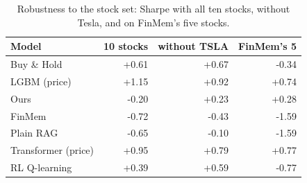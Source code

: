\begin{table}[H]
\centering
\small
\caption{Robustness to the stock set: Sharpe with all ten stocks, without Tesla, and on FinMem's five stocks.}
\label{tab:ext-robust}
\begin{tabular}{lrrr}
\toprule
Model & 10 stocks & without TSLA & FinMem's 5 \\
\midrule
Buy \& Hold & +0.61 & +0.67 & -0.34 \\
LGBM (price) & +1.15 & +0.92 & +0.74 \\
Ours & -0.20 & +0.23 & +0.28 \\
FinMem & -0.72 & -0.43 & -1.59 \\
Plain RAG & -0.65 & -0.10 & -1.59 \\
Transformer (price) & +0.95 & +0.79 & +0.77 \\
RL Q-learning & +0.39 & +0.59 & -0.77 \\
\bottomrule
\end{tabular}
\end{table}
